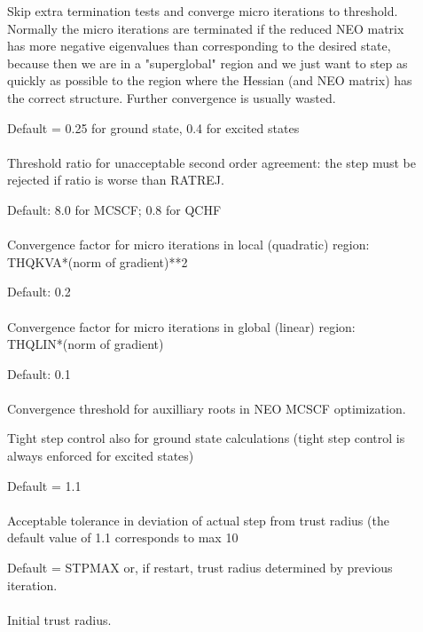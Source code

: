 \begin{description}
\item[]
  Skip extra termination tests and converge micro iterations to
  threshold.   Normally the micro iterations are terminated if the
  reduced NEO matrix has more negative eigenvalues than corresponding
  to the desired state, because then we are in a "superglobal" region
  and we just want to step as quickly as possible to the region where
  the Hessian (and NEO matrix) has the correct structure.  Further
  convergence is usually wasted.
 
\item[]
  Default = 0.25 for ground state, 0.4 for excited states\\
   \\
  Threshold ratio for unacceptable second order agreement: the step
  must be rejected if ratio is worse than RATREJ.
 
\item[]
  Default: 8.0 for MCSCF; 0.8 for QCHF\\
   \\
  Convergence factor for micro iterations in local (quadratic) region:
  THQKVA*(norm of gradient)**2
 
\item[]
  Default: 0.2\\
   \\
  Convergence factor for micro iterations in global (linear) region: \\
  THQLIN*(norm of gradient)
 
\item[]
  Default: 0.1\\
   \\
  Convergence threshold for auxilliary roots in NEO MCSCF optimization.
 
\item[]
  Tight step control also for ground state calculations
  (tight step control is always enforced for excited states)
 
\item[]
  Default = 1.1\\
   \\
  Acceptable tolerance in deviation of actual step from trust radius
  (the default value of 1.1 corresponds to max 10%
 
\item[]
  Default = STPMAX or, if restart, trust radius determined by previous
            iteration.\\
   \\
  Initial trust radius.
 
\end{description}
 
